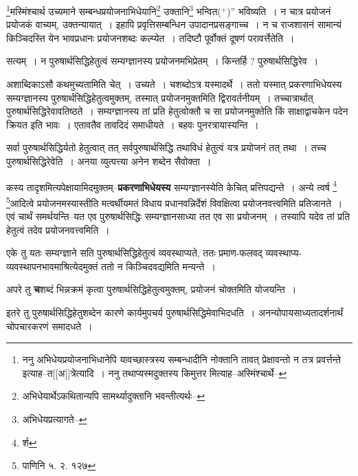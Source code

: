 \documentclass[article,12pt,a4paper]{memoir}
\newcommand{\add}[1]{($^{+}$#1)}
\begin{document}
	\footnote{ननु अभिधेयप्रयोजनाभिधानेपि यावच्छास्त्रस्य सम्बन्धादीनि नोक्तानि तावत् प्रेक्षावन्तो न तत्र प्रवर्त्तन्ते इत्याह--त[[अ]]त्रेत्यादि । ननु तथाप्यस्मदुक्तस्य किमुत्तर मित्याह--अस्मिंश्चार्थे--\cite{dp-msD-n}}मस्मिंश्चार्थ उच्यमाने सम्बन्धप्रयोजनाभिधेयानि\footnote{अभिधेयार्थेऽकथितान्यपि सामर्थ्यादुक्तानि भवन्तीत्यर्थः--\cite{dp-msD-n}} उक्तानि\footnote{अभिधेयप्रत्यागते--} भन्वित\add{}” भविष्यति । न चात्र प्रयोजनं प्रयोजकं वाच्यम्, उक्तन्यायात् । इहापि प्रवृत्तिसम्बन्धिन उपादानप्रसङ्गाच्च । न च राजशासनं सामान्यं किञ्चिदस्ति येन भावप्रधानः प्रयोजनशब्दः कल्प्येत । तदिष्टौ पूर्वोक्तं दूषणं परावर्त्तेतेति ।
	\pend
      

	  \pstart सत्यम् । न पुरुषार्थसिद्धिहेतुत्वं सम्यग्ज्ञानस्य प्रयोजनमभिप्रेतम् । किन्तर्हि ? पुरुषार्थसिद्धिरेव ।
	\pend
      

	  \pstart अशाब्दिकाऽसौ कथमुच्यतामिति चेत् । उच्यते । चशब्दोऽत्र यस्मादर्थे । ततो यस्मात् प्रकरणाभिधेयस्य सम्यग्ज्ञानस्य पुरुषार्थसिद्धिहेतुत्वमुक्तम्, तस्मात् प्रयोजनमुक्तमिति द्विरावर्तनीयम् । तच्चात्रार्थात् पुरुषार्थसिद्धिरेवावतिष्ठते । सम्यग्ज्ञानस्य तां प्रति हेतुत्वोक्तौ च सा प्रयोजनमुक्तेति किं साक्षाद्वाचकेन पदेन क्रियत इति भावः । एतावतैव तावदिदं समाधीयते । बहवः पुनरत्रायास्यन्ति ।
	\pend
      

	  \pstart सर्वा पुरुषार्थसिद्धिर्यतो हेतुत्वात् तत् सर्वपुरुषार्थसिद्धि तथाविधं हेतुत्वं यत्र प्रयोजनं तत् तथा । तच्च पुरुषार्थसिद्धिरेवेति । अनया व्युत्पत्त्या अनेन शब्देन सैवोक्ता ।
	\pend
      

	  \pstart कस्य तादृशमित्यपेक्षायामिदमुक्तम्--\textbf{प्रकरणाभिधेयस्य} सम्यग्ज्ञानस्येति केचित् प्रत्तिपद्यन्ते । अन्ये त्वर्ष \footnote{र्श} \footnote{पाणिनि \cite{dp-msD-n} ५. २. १२७}आदित्वे प्रयोजनमस्यास्तीति मत्वर्थीयमतं विधाय प्रधानवन्निर्देशं विवक्षित्वा प्रयोजनवत्त्वमिति प्रतिजानते । एवं चार्थं समर्थयन्ति--यत एव पुरुषार्थसिद्धिः सम्यग्ज्ञानसाध्या तत एव सा प्रयोजनम् । तस्यापि यदेव तां प्रति हेतुत्वं तदेव प्रयोजनवत्त्वमिति ।
	\pend
      

	  \pstart एके तु यतः सम्यग्ज्ञाने सति पुरुषार्थसिद्धिहेतुत्वं व्यवस्थाप्यते, ततः प्रमाण-फलवद् व्यवस्थाप्य-व्यवस्थापनभावमाश्रित्येदमुक्तं ततो न किञ्चिदवद्यमिति मन्यन्ते ।
	\pend
      

	  \pstart अपरे तु \textbf{च}शब्दं भिन्नक्रमं कृत्वा पुरुषार्थसिद्धिहेतुत्वमुक्तम्, प्रयोजनं चोक्तमिति योजयन्ति ।
	\pend
      

	  \pstart इतरे तु पुरुषार्थसिद्धिहेतुशब्देन कारणे कार्यमुपचर्य पुरुषार्थसिद्धिमेवाभिदधति । अनन्योपायसाध्यतादर्शनार्थं चोपचारकरणं समादधते ।
	\pend
      
\end{document}
